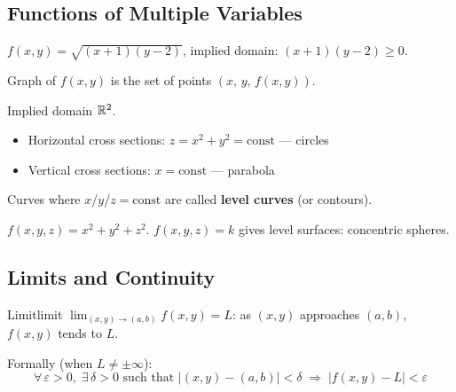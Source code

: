 \subsection{Functions of Multiple Variables}

\begin{example}
  $f(x,y) = \sqrt{(x+1)(y-2)}$, \; implied domain: $(x+1)(y-2)\ge 0$.
\end{example}

Graph of $f(x,y)$ is the set of points $(x,\,y,\,f(x,y))$.

\begin{example}[$f(x,y)=x^{2}+y^{2}$]
  Implied domain $\mathbb{R}^{2}$.
  \begin{itemize}
    \item Horizontal cross sections: $z = x^{2}+y^{2} = \text{const}$ — circles
    \item Vertical cross sections: $x = \text{const}$ — parabola
  \end{itemize}

  \begin{center}
  \end{center}
\end{example}

Curves where $x$/$y$/$z = \text{const}$ are called \textbf{level curves} (or contours).

\begin{example}
  $f(x,y,z)=x^{2}+y^{2}+z^{2}$. \;
  $f(x,y,z)=k$ gives level surfaces: concentric spheres.
\end{example}

\subsection{Limits and Continuity}

\begin{definition}{Limit}{limit}
  $\displaystyle\lim_{(x,y)\to(a,b)}f(x,y) = L$:
  as $(x,y)$ approaches $(a,b)$, $f(x,y)$ tends to $L$.

  Formally (when $L\neq\pm\infty$):
  \[
    \forall\,\varepsilon>0,\;\exists\,\delta>0
    \text{ such that }
    \lvert(x,y)-(a,b)\rvert<\delta
    \;\Longrightarrow\;
    \lvert f(x,y)-L\rvert<\varepsilon
  \]
\end{definition}

